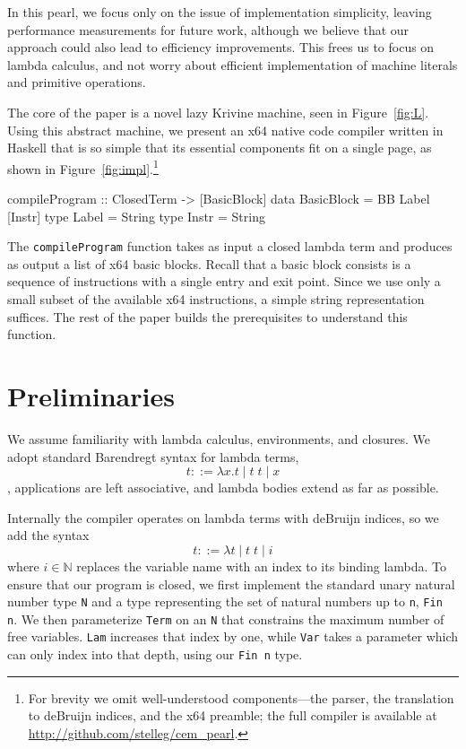 \documentclass[preprint]{sigplanconf}
\begin{document}
In this pearl, we focus only on the issue of implementation simplicity, leaving
performance measurements for future work, although we believe that our approach
could also lead to efficiency improvements. This frees us to focus on lambda
calculus, and not worry about efficient implementation of machine literals and
primitive operations. 

The core of the paper is a novel lazy Krivine machine, seen in
Figure~\ref{fig:L}. Using this abstract machine, we present an x64 native code
compiler written in Haskell that is so simple that its essential components fit
on a single page, as shown in Figure~\ref{fig:impl}.\footnote{For brevity we
omit well-understood components---the parser, the translation to deBruijn
indices, and the x64 preamble; the full compiler is available at
\url{http://github.com/stelleg/cem_pearl}.} 

\begin{code}
compileProgram :: ClosedTerm -> [BasicBlock]
data BasicBlock = BB Label [Instr]
type Label = String
type Instr = String
\end{code}

The \texttt{compileProgram} function takes as input a closed lambda term and
produces as output a list of x64 basic blocks. Recall that a basic block
consists is a sequence of instructions with a single entry and exit point.
Since we use only a small subset of the available x64 instructions, a simple
string representation suffices. The rest of the paper builds the prerequisites
to understand this function.

\section{Preliminaries}
We assume familiarity with lambda calculus, environments, and closures.
We adopt standard Barendregt syntax \cite{barendregt1984lambda} for lambda
terms, $$ t ::=  \lambda x.t \; | \; t \;  t \; | \; x $$, applications are
left associative, and lambda bodies extend as far as possible. 

Internally the compiler operates on lambda terms with deBruijn indices, so we
add the syntax $$ t ::= \lambda t \; | \; t \; t \; | \; i $$ where $i \in
\mathbb{N}$ replaces the variable name with an index to its binding lambda. To
ensure that our program is closed, we first implement the standard unary natural
number type \texttt{N} and a type representing the set of natural numbers up to
\texttt{n}, \texttt{Fin n}. We then parameterize \texttt{Term} on an \texttt{N}
that constrains the maximum number of free variables. \texttt{Lam} increases
that index by one, while \texttt{Var} takes a parameter which can only index
into that depth, using our \texttt{Fin n} type.
\end{document}
